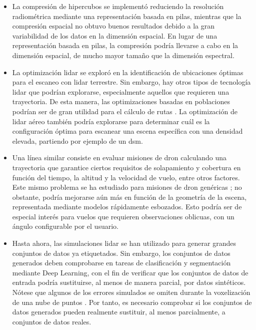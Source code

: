 \begin{itemize}
    \item La compresión de hipercubos se implementó reduciendo la resolución radiométrica mediante una representación basada en pilas, mientras que la compresión espacial no obtuvo buenos resultados debido a la gran variabilidad de los datos en la dimensión espacial. En lugar de una representación basada en pilas, la compresión podría llevarse a cabo en la dimensión espacial, de mucho mayor tamaño que la dimensión espectral. 
    \item La optimización \acrshort{lidar} se exploró en la identificación de ubicaciones óptimas para el escaneo con \acrshort{lidar} terrestre. Sin embargo, hay otros tipos de tecnología \acrshort{lidar} que podrían explorarse, especialmente aquellos que requieren una trayectoria. De esta manera, las optimizaciones basadas en poblaciones podrían ser de gran utilidad para el cálculo de rutas \cite{roberge_fast_2018}. La optimización de \acrshort{lidar} aéreo también podría explorarse para determinar cuál es la configuración óptima para escanear una escena específica con una densidad elevada, partiendo por ejemplo de un \acrshort{dsm}.
    \item Una línea similar consiste en evaluar misiones de dron calculando una trayectoria que garantice ciertos requisitos de solapamiento y cobertura en función del tiempo, la altitud y la velocidad de vuelo, entre otros factores. Este mismo problema se ha estudiado para misiones de dron genéricas \cite{pessacg_simplifying_2022}; no obstante, podría mejorarse aún más en función de la geometría de la escena, representada mediante modelos rápidamente esbozados. Esto podría ser de especial interés para vuelos que requieren observaciones oblicuas, con un ángulo configurable por el usuario. 
    \item Hasta ahora, las simulaciones \acrshort{lidar} se han utilizado para generar grandes conjuntos de datos ya etiquetados. Sin embargo, los conjuntos de datos generados deben comprobarse en tareas de clasificación y segmentación mediante Deep Learning, con el fin de verificar que los conjuntos de datos de entrada podría sustituirse, al menos de manera parcial, por datos sintéticos. Nótese que algunos de los errores simulados se omiten durante la voxelización de  una nube de puntos \cite{hackel_semantic3d_2017, behley_towards_2021}. Por tanto, es necesario comprobar si los conjuntos de datos generados pueden realmente sustituir, al menos parcialmente, a conjuntos de datos reales. 

\end{itemize}
